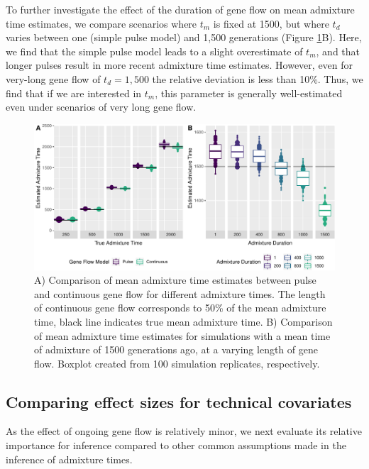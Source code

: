 \documentclass[]{article}
\begin{document}
To further investigate the effect of the duration of gene flow on mean
admixture time estimates, we compare scenarios where $t_m$ is fixed at 1500, but where $t_d$ varies between one (simple pulse model) and 1,500 generations (Figure \ref{fig:fig2}B). Here, we find that the simple pulse model leads to a slight overestimate of $t_m$, and that longer pulses result in more recent admixture time estimates. However, even  for very-long gene flow of $t_d=1,500$ the relative deviation is less than 10\%. Thus, we find that if we are interested in $t_m$, this parameter is generally well-estimated even under scenarios of very long gene flow.



\begin{figure}
\centering
\includegraphics{Admixture_Time_Inference_Paper_Draft_files/figure-latex/fig2-1.pdf}
\caption{\label{fig:fig2} A) Comparison of mean admixture time estimates
between pulse and continuous gene flow for different admixture times.
The length of continuous gene flow corresponds to 50\% of the mean
admixture time, black line indicates true mean admixture time. B)
Comparison of mean admixture time estimates for simulations with a mean
time of admixture of 1500 generations ago, at a varying length of gene
flow. Boxplot created from 100 simulation replicates, respectively.}
\end{figure}


\subsection{Comparing effect sizes for technical covariates}\label{comparing effect sizes}

As the effect of ongoing gene flow is relatively minor, we next evaluate its relative importance for inference compared to other common assumptions made in the inference of admixture times. 
\end{document}
